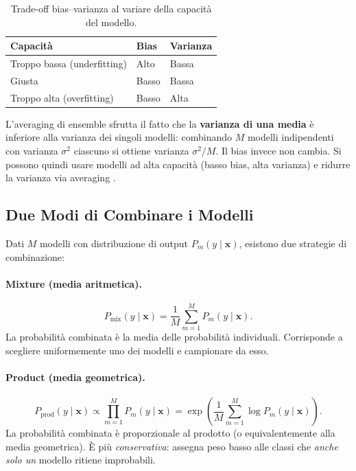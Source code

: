 \begin{table}[H]
  \centering
  \caption{Trade-off bias--varianza al variare della capacità del modello.}
  \label{tab:bias-variance}
  \small
  \begin{tabular}{lll}
    \toprule
    \textbf{Capacità} & \textbf{Bias} & \textbf{Varianza} \\
    \midrule
    Troppo bassa (underfitting) & Alto & Bassa \\
    Giusta & Basso & Bassa \\
    Troppo alta (overfitting) & Basso & Alta \\
    \bottomrule
  \end{tabular}
\end{table}

L'averaging di ensemble sfrutta il fatto che la \textbf{varianza di una media}
è inferiore alla varianza dei singoli modelli: combinando $M$ modelli
indipendenti con varianza $\sigma^2$ ciascuno si ottiene varianza $\sigma^2/M$.
Il bias invece non cambia. Si possono quindi usare modelli ad alta capacità
(basso bias, alta varianza) e ridurre la varianza via averaging
\citep{bishop2024}.

\subsection{Due Modi di Combinare i Modelli}
\label{subsec:mixture-product}

Dati $M$ modelli con distribuzione di output $P_m(y \mid \mathbf{x})$, esistono
due strategie di combinazione:

\paragraph{Mixture (media aritmetica).}
\begin{equation}
  P_{\text{mix}}(y \mid \mathbf{x}) = \frac{1}{M}\sum_{m=1}^{M} P_m(y \mid \mathbf{x}).
  \label{eq:mixture}
\end{equation}
La probabilità combinata è la media delle probabilità individuali. Corrisponde
a scegliere uniformemente uno dei modelli e campionare da esso.

\paragraph{Product (media geometrica).}
\begin{equation}
  P_{\text{prod}}(y \mid \mathbf{x}) \propto \prod_{m=1}^{M} P_m(y \mid \mathbf{x})
  = \exp\!\left(\frac{1}{M}\sum_{m=1}^{M} \log P_m(y \mid \mathbf{x})\right).
  \label{eq:product}
\end{equation}
La probabilità combinata è proporzionale al prodotto (o equivalentemente alla
media geometrica). È più \emph{conservativa}: assegna peso basso alle classi
che \emph{anche solo un} modello ritiene improbabili.


